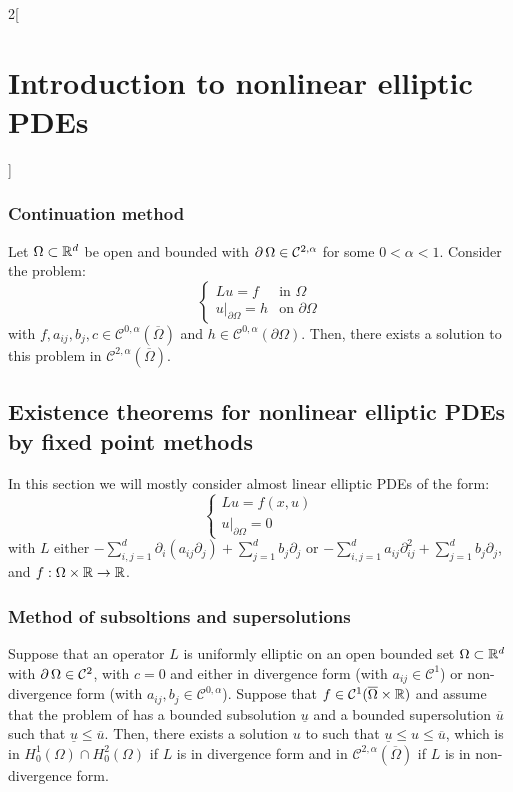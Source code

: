 \documentclass[../../../main_math.tex]{subfiles}
\begin{document}
\begin{multicols}{2}[\section{Introduction to nonlinear elliptic PDEs}]
  \subsubsection{Continuation method}
  \begin{theorem}
    Let $\Omega\subset\mathbb{R}^d$ be open and bounded with $\operatorname{\partial}{\Omega}\in\mathcal{C}^{2,\alpha}$ for some $0<\alpha<1$. Consider the problem:
    $$
      \begin{cases}
        Lu=f                  & \text{in }\Omega         \\
        u|_{\partial\Omega}=h & \text{on }\partial\Omega
      \end{cases}
    $$
    with $f,a_{ij},b_j,c\in\mathcal{C}^{0,\alpha}( \overline{\Omega})$ and $h\in\mathcal{C}^{0,\alpha}(\partial\Omega)$. Then, there exists a solution to this problem in $\mathcal{C}^{2,\alpha}(\overline{\Omega})$.
  \end{theorem}
  \subsection{Existence theorems for nonlinear elliptic PDEs by fixed point methods}
  In this section we will mostly consider almost linear elliptic PDEs of the form:
  \begin{equation}\label{INLEPDE:AlmostLinear}
    \begin{cases}
      Lu=f(x,u) \\
      u|_{\partial\Omega}=0
    \end{cases}
  \end{equation}
  with $L$ either $-\sum_{i,j=1}^d\partial_i(a_{ij}\partial_j)+\sum_{j=1}^db_j\partial_j$ or $-\sum_{i,j=1}^d a_{ij} \partial_{ij}^2+\sum_{j=1}^db_j\partial_j$, and $f:\Omega\times \mathbb{R}\to \mathbb{R}$.
  \subsubsection{Method of subsoltions and supersolutions}
  \begin{theorem}
    Suppose that an operator $L$ is uniformly elliptic on an open bounded set $\Omega\subset\mathbb{R}^d$ with $\operatorname{\partial}{\Omega}\in \mathcal{C}^2$, with $c=0$ and either in divergence form (with $a_{ij}\in\mathcal{C}^1$) or non-divergence form (with $a_{ij},b_j\in\mathcal{C}^{0,\alpha}$). Suppose that $f\in\mathcal{C}^1(\overline{\Omega}\times \mathbb{R})$ and assume that the problem of  has a bounded subsolution $\underline{u}$ and a bounded supersolution $\overline{u}$ such that $\underline{u}\leq \overline{u}$. Then, there exists a solution $u$ to  such that $\underline{u}\leq u\leq \overline{u}$, which is in $H_0^1(\Omega)\cap H_0^2(\Omega)$ if $L$ is in divergence form and in $\mathcal{C}^{2,\alpha}(\overline{\Omega})$ if $L$ is in non-divergence form.
  \end{theorem}

\end{multicols}
\end{document}
